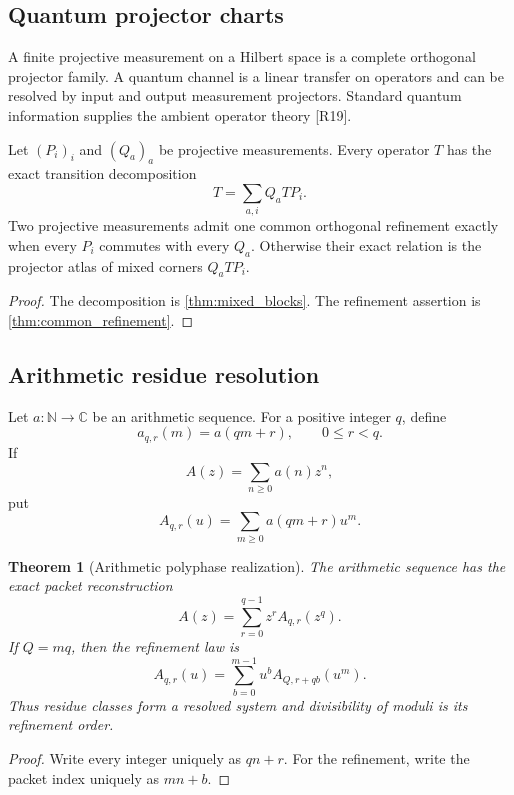 \documentclass{aomart}
\newtheorem{theorem}{Theorem}[section]
\theoremstyle{definition}
\theoremstyle{remark}
\newcommand{\CC}{\mathbb C}
\newcommand{\NN}{\mathbb N}
\newcommand{\Rcite}[1]{\textup{[#1]}}
\begin{document}
\subsection{Quantum projector charts}

A finite projective measurement on a Hilbert space is a complete orthogonal projector family. A quantum channel is a linear transfer on operators and can be resolved by input and output measurement projectors. Standard quantum information supplies the ambient operator theory \Rcite{R19}.

\begin{proposition}\label{prop:quantum_realization}
Let \((P_i)_i\) and \((Q_a)_a\) be projective measurements. Every operator \(T\) has the exact transition decomposition
\[
 \boxed{
 T=\sum_{a,i}Q_aTP_i.
 }
\]
Two projective measurements admit one common orthogonal refinement exactly when every \(P_i\) commutes with every \(Q_a\). Otherwise their exact relation is the projector atlas of mixed corners \(Q_aTP_i\).
\end{proposition}

\begin{proof}
The decomposition is \cref{thm:mixed_blocks}. The refinement assertion is \cref{thm:common_refinement}.
\end{proof}

\subsection{Arithmetic residue resolution}

Let \(a:\NN\to\CC\) be an arithmetic sequence. For a positive integer \(q\), define
\[
 a_{q,r}(m)=a(qm+r),
 \qquad
 0\le r<q.
\]
If
\[
 A(z)=\sum_{n\ge0}a(n)z^n,
\]
put
\[
 A_{q,r}(u)=\sum_{m\ge0}a(qm+r)u^m.
\]

\begin{theorem}[Arithmetic polyphase realization]\label{thm:arithmetic_polyphase}
The arithmetic sequence has the exact packet reconstruction
\[
 \boxed{
 A(z)
 =
 \sum_{r=0}^{q-1}z^rA_{q,r}(z^q).
 }
\]
If \(Q=mq\), then the refinement law is
\[
 \boxed{
 A_{q,r}(u)
 =
 \sum_{b=0}^{m-1}
 u^bA_{Q,r+qb}(u^m).
 }
\]
Thus residue classes form a resolved system and divisibility of moduli is its refinement order.
\end{theorem}

\begin{proof}
Write every integer uniquely as \(qn+r\). For the refinement, write the packet index uniquely as \(mn+b\).
\end{proof}
\end{document}
